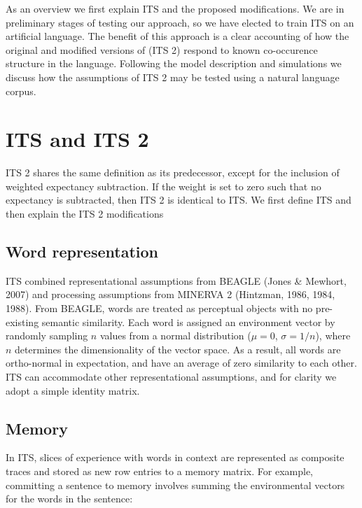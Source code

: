 \documentclass[
  jou]{apa6}
\begin{document}
As an overview we first explain ITS and the proposed modifications. We are in preliminary stages of testing our approach, so we have elected to train ITS on an artificial language. The benefit of this approach is a clear accounting of how the original and modified versions of (ITS 2) respond to known co-occurence structure in the language. Following the model description and simulations we discuss how the assumptions of ITS 2 may be tested using a natural language corpus.

\hypertarget{its-and-its-2}{%
\section{ITS and ITS 2}\label{its-and-its-2}}

ITS 2 shares the same definition as its predecessor, except for the inclusion of weighted expectancy subtraction. If the weight is set to zero such that no expectancy is subtracted, then ITS 2 is identical to ITS. We first define ITS and then explain the ITS 2 modifications

\hypertarget{word-representation}{%
\subsection{Word representation}\label{word-representation}}

ITS combined representational assumptions from BEAGLE (Jones \& Mewhort, 2007) and processing assumptions from MINERVA 2 (Hintzman, 1986, 1984, 1988). From BEAGLE, words are treated as perceptual objects with no pre-existing semantic similarity. Each word is assigned an environment vector by randomly sampling \(n\) values from a normal distribution (\(\mu = 0\), \(\sigma = 1/n\)), where \(n\) determines the dimensionality of the vector space. As a result, all words are ortho-normal in expectation, and have an average of zero similarity to each other. ITS can accommodate other representational assumptions, and for clarity we adopt a simple identity matrix.

\hypertarget{memory}{%
\subsection{Memory}\label{memory}}

In ITS, slices of experience with words in context are represented as composite traces and stored as new row entries to a memory matrix. For example, committing a sentence to memory involves summing the environmental vectors for the words in the sentence:
\end{document}
